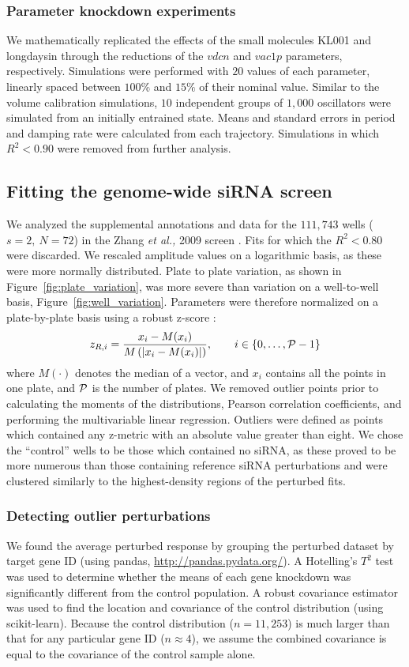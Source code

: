 \documentclass[11pt, letterpaper]{article}
\begin{document}
\subsubsection*{Parameter knockdown experiments}
We mathematically replicated the effects of the small molecules KL001 and longdaysin through the reductions of the $vdcn$ and $vac1p$ parameters, respectively.
Simulations were performed with $20$ values of each parameter, linearly spaced between $100\%$ and $15\%$ of their nominal value.
Similar to the volume calibration simulations, $10$ independent groups of $1,000$ oscillators were simulated from an initially entrained state.
Means and standard errors in period and damping rate were calculated from each trajectory.
Simulations in which $R^2 < 0.90$ were removed from further analysis.

\subsection*{Fitting the genome-wide siRNA screen}
We analyzed the supplemental annotations and data for the $111,743$ wells ($s=2,\ N=72$) in the Zhang {\itshape et al.,} 2009 screen \cite{Zhang2009}.
Fits for which the $R^2 < 0.80$ were discarded.
We rescaled amplitude values on a logarithmic basis, as these were more normally distributed.
Plate to plate variation, as shown in Figure~\ref{fig:plate_variation}, was more severe than variation on a well-to-well basis, Figure~\ref{fig:well_variation}.
Parameters were therefore normalized on a plate-by-plate basis using a robust z-score \cite{Birmingham2009}:
\[
  z_{R,i} = \frac{x_i - M(x_i)}{M\left(\left|x_i - M(x_i)\right|\right)}, \qquad i \in \{0, \dots, {\cal P} - 1 \}
\]
where $M(\cdot)$ denotes the median of a vector, and $x_i$ contains all the points in one plate, and $\cal P$ is the number of plates.
We removed outlier points prior to calculating the moments of the distributions, Pearson correlation coefficients, and performing the multivariable linear regression.
Outliers were defined as points which contained any z-metric with an absolute value greater than eight.
We chose the ``control'' wells to be those which contained no siRNA, as these proved to be more numerous than those containing reference siRNA perturbations and were clustered similarly to the highest-density regions of the perturbed fits.

\subsubsection*{Detecting outlier perturbations}
We found the average perturbed response by grouping the perturbed dataset by target gene ID (using pandas, \url{http://pandas.pydata.org/}).
A Hotelling's $T^2$ test was used to determine whether the means of each gene knockdown was significantly different from the control population.
A robust covariance estimator was used to find the location and covariance of the control distribution (using scikit-learn).
Because the control distribution ($n=11,253$) is much larger than that for any particular gene ID ($n \approx 4$), we assume the combined covariance is equal to the covariance of the control sample alone.
\end{document}
